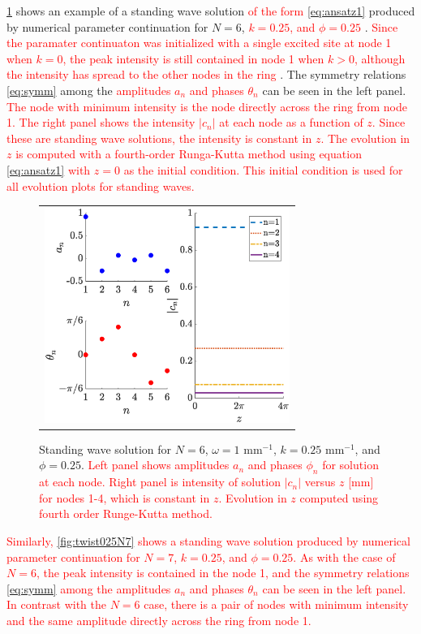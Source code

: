\documentclass[reprint, amsmath,amssymb,aps,pra]{revtex4-2}
\renewcommand{\revised}[1]{ \textcolor{red}{#1} }
\begin{document}
\cref{fig:twist025} shows an example of a standing wave solution \revised{of the form \cref{eq:ansatz1}} produced by numerical parameter continuation for $N = 6$, \revised{$k = 0.25$, and $\phi = 0.25$}. \revised{Since the paramater continuaton was initialized with a single excited site at node 1 when $k=0$, the peak intensity is still contained in node 1 when $k>0$, although the intensity has spread to the other nodes in the ring}. The symmetry relations \cref{eq:symm} among the \revised{amplitudes $a_n$ and phases $\theta_n$} can be seen in the left panel. \revised{The node with minimum intensity is the node directly across the ring from node 1. The right panel shows the intensity $|c_n|$ at each node as a function of $z$. Since these are standing wave solutions, the intensity is constant in $z$. The evolution in $z$ is computed with a fourth-order Runga-Kutta method using equation \cref{eq:ansatz1} with $z=0$ as the initial condition. This initial condition is used for all evolution plots for standing waves.}

\begin{figure}
\begin{center}
\begin{tabular}{c}
\includegraphics[width=8cm]{twist025.eps}
\end{tabular}
\end{center}
\caption{Standing wave solution for $N = 6$, $\omega = 1 \text{ mm}^{-1}$, $k = 0.25 \text{ mm}^{-1}$, and $\phi = 0.25$. \revised{Left panel shows amplitudes $a_n$ and phases $\phi_n$ for solution at each node. Right panel is intensity of solution $|c_n|$ versus $z$ [mm] for nodes 1-4, which is constant in $z$. Evolution in $z$ computed using fourth order Runge-Kutta method.} }
\label{fig:twist025}
\end{figure}

\revised{Similarly, \cref{fig:twist025N7} shows a standing wave solution produced by numerical parameter continuation for $N = 7$, $k = 0.25$, and $\phi = 0.25$. As with the case of $N=6$, the peak intensity is contained in the node 1, and the symmetry relations \cref{eq:symm} among the amplitudes $a_n$ and phases $\theta_n$ can be seen in the left panel. In contrast with the $N=6$ case, there is a pair of nodes with minimum intensity and the same amplitude directly across the ring from node 1.}
\end{document}
